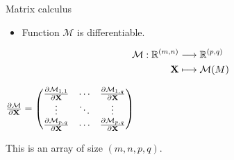 \documentclass[xcolor=pdftex,dvipsnames,table,mathserif]{beamer}
\begin{document}
\begin{frame}{Matrix calculus}

\begin{itemize}
\item Function $\mathcal{M}$ is differentiable.
\end{itemize}

      \begin{equation*}
    \begin{split}
      \mathcal{M}: \mathbb{R}^{(m,n)} & \longrightarrow \mathbb{R}^{(p,q)}\\
      \mathbf{X}      & \longmapsto \mathcal{M}(M)
    \end{split}
  \end{equation*}

  \begin{block}{}
        \centering
        $\frac{\partial \mathcal{M}}{\partial \mathbf{X}} =
        \begin{pmatrix}
          \frac{\partial \mathcal{M}_{1,1}}{\partial \mathbf{X}} & \cdots & \frac{\partial \mathcal{M}_{1,q}}{\partial \mathbf{X}}  \\
          \vdots  & \ddots & \vdots  \\
          \frac{\partial \mathcal{M}_{p,q}}{\partial \mathbf{X}} & \cdots & \frac{\partial \mathcal{M}_{p,q}}{\partial \mathbf{X}}
        \end{pmatrix}
        $

      \end{block}

  This is an array of size $(m, n, p, q)$.


\end{frame}
\end{document}
